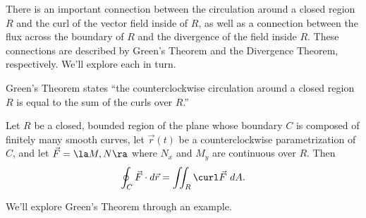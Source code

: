 There is an important connection between the circulation around a closed region $R$ and the curl of the vector field inside of $R$, as well as a connection between the flux across the boundary of $R$ and the divergence of the field inside $R$. These connections are described by Green's Theorem and the Divergence Theorem, respectively. We'll explore each in turn.

Green's Theorem states ``the counterclockwise circulation around a closed region $R$ is equal to the sum of the curls over $R$.''

{Let $R$ be a closed, bounded region of the plane whose boundary $C$ is composed of finitely many smooth curves, let $\vec r(t)$ be a counterclockwise parametrization of $C$, and let $\vec F =\la M,N\ra$ where $N_x$ and $M_y$ are continuous over $R$. Then
\[
\oint_C \vec F\cdot d\vec r = \iint_R\curl \vec F\ dA.
\]
}

We'll explore Green's Theorem through an example. \\

